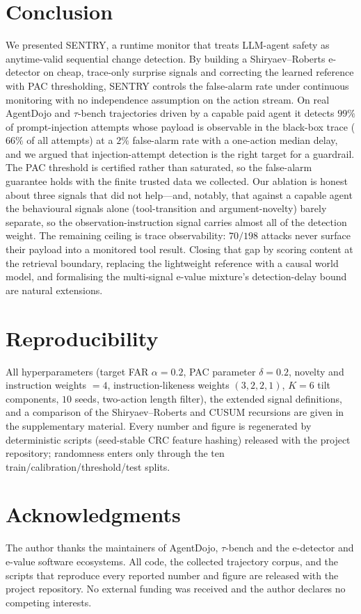 \documentclass[10pt,journal,compsoc]{IEEEtran}
\theoremstyle{plain}
\theoremstyle{definition}
\begin{document}
\section{Conclusion}\label{sec:conclusion}

We presented SENTRY, a runtime monitor that treats LLM-agent safety as
anytime-valid sequential change detection. By building a Shiryaev--Roberts
e-detector on cheap, trace-only surprise signals and correcting the learned
reference with PAC thresholding, SENTRY controls the false-alarm rate under
continuous monitoring with no independence assumption on the action stream. On
real AgentDojo and \(\tau\)-bench trajectories driven by a capable paid agent
it detects \(99\%\) of prompt-injection attempts whose payload is observable in
the black-box trace (\(66\%\) of all attempts) at a \(2\%\) false-alarm rate
with a one-action median delay, and we argued that injection-attempt detection
is the right target for a guardrail. The PAC threshold is certified rather than
saturated, so the false-alarm guarantee holds with the finite trusted data we
collected. Our ablation is honest about three signals that did not help---and,
notably, that against a capable agent the behavioural signals alone
(tool-transition and argument-novelty) barely separate, so the
observation-instruction signal carries almost all of the detection weight. The
remaining ceiling is trace observability: \(70/198\) attacks never surface
their payload into a monitored tool result. Closing that gap by scoring content
at the retrieval boundary, replacing the lightweight reference with a causal
world model, and formalising the multi-signal e-value mixture's detection-delay
bound are natural extensions.


\section*{Reproducibility}
All hyperparameters (target FAR $\alpha=0.2$, PAC parameter $\delta=0.2$, novelty and instruction weights $=4$, instruction-likeness weights $(3,2,2,1)$, $K=6$ tilt components, $10$ seeds, two-action length filter), the extended signal definitions, and a comparison of the Shiryaev--Roberts and CUSUM recursions are given in the supplementary material. Every number and figure is regenerated by deterministic scripts (seed-stable CRC feature hashing) released with the project repository; randomness enters only through the ten train/calibration/threshold/test splits.

\section*{Acknowledgments}
The author thanks the maintainers of AgentDojo, $\tau$-bench and the
e-detector and e-value software ecosystems. All code, the collected
trajectory corpus, and the scripts that reproduce every reported number and
figure are released with the project repository. No external funding was
received and the author declares no competing interests.
\end{document}
